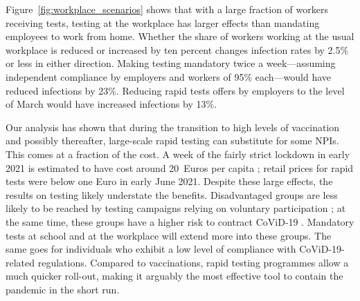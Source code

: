 Figure~\ref{fig:workplace_scenarios} shows that with a large fraction of workers
receiving tests, testing at the workplace has larger effects than mandating employees to
work from home. Whether the share of workers working at the usual workplace is reduced
or increased by ten percent changes infection rates by 2.5\% or less in either
direction. Making testing mandatory twice a week---assuming independent compliance by
employers and workers of 95\% each---would have reduced infections by 23\%. Reducing
rapid tests offers by employers to the level of March would have increased infections by
13\%.

Our analysis has shown that during the transition to high levels of vaccination and
possibly thereafter, large-scale rapid testing can substitute for some NPIs. This comes
at a fraction of the cost. A week of the fairly strict lockdown in early 2021 is
estimated to have cost around 20~Euros per capita \citep{Wollmershauser2021}; retail
prices for rapid tests were below one Euro in early June 2021. Despite these large
effects, the results on testing likely understate the benefits. Disadvantaged groups are
less likely to be reached by testing campaigns relying on voluntary participation
\citep[e.g.][]{StillmanTonin2021}; at the same time, these groups have a higher risk to
contract CoViD-19 \citep{KochInstitut2021a}. Mandatory tests at school and at the
workplace will extend more into these groups. The same goes for individuals who exhibit
a low level of compliance with CoViD-19-related regulations. Compared to vaccinations,
rapid testing programmes allow a much quicker roll-out, making it arguably the most
effective tool to contain the pandemic in the short run.
